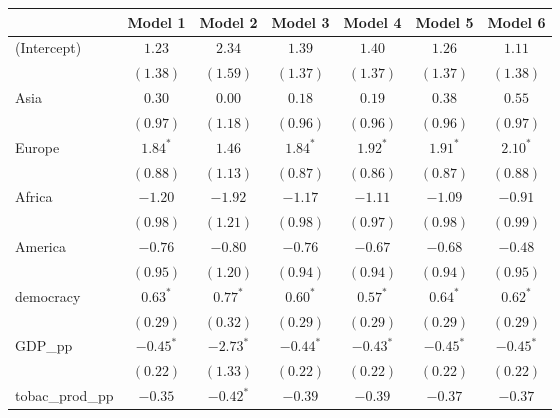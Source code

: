 
\begin{table}[!h]
\begin{center}
\begin{tabular}{l c c c c c c }
\toprule
 & Model 1 & Model 2 & Model 3 & Model 4 & Model 5 & Model 6 \\
\midrule
(Intercept)             & $1.23$       & $2.34$      & $1.39$       & $1.40$       & $1.26$       & $1.11$       \\
                        & $(1.38)$     & $(1.59)$    & $(1.37)$     & $(1.37)$     & $(1.37)$     & $(1.38)$     \\
Asia                    & $0.30$       & $0.00$      & $0.18$       & $0.19$       & $0.38$       & $0.55$       \\
                        & $(0.97)$     & $(1.18)$    & $(0.96)$     & $(0.96)$     & $(0.96)$     & $(0.97)$     \\
Europe                  & $1.84^{*}$   & $1.46$      & $1.84^{*}$   & $1.92^{*}$   & $1.91^{*}$   & $2.10^{*}$   \\
                        & $(0.88)$     & $(1.13)$    & $(0.87)$     & $(0.86)$     & $(0.87)$     & $(0.88)$     \\
Africa                  & $-1.20$      & $-1.92$     & $-1.17$      & $-1.11$      & $-1.09$      & $-0.91$      \\
                        & $(0.98)$     & $(1.21)$    & $(0.98)$     & $(0.97)$     & $(0.98)$     & $(0.99)$     \\
America                 & $-0.76$      & $-0.80$     & $-0.76$      & $-0.67$      & $-0.68$      & $-0.48$      \\
                        & $(0.95)$     & $(1.20)$    & $(0.94)$     & $(0.94)$     & $(0.94)$     & $(0.95)$     \\
democracy               & $0.63^{*}$   & $0.77^{*}$  & $0.60^{*}$   & $0.57^{*}$   & $0.64^{*}$   & $0.62^{*}$   \\
                        & $(0.29)$     & $(0.32)$    & $(0.29)$     & $(0.29)$     & $(0.29)$     & $(0.29)$     \\
GDP\_pp                 & $-0.45^{*}$  & $-2.73^{*}$ & $-0.44^{*}$  & $-0.43^{*}$  & $-0.45^{*}$  & $-0.45^{*}$  \\
                        & $(0.22)$     & $(1.33)$    & $(0.22)$     & $(0.22)$     & $(0.22)$     & $(0.22)$     \\
tobac\_prod\_pp         & $-0.35$      & $-0.42^{*}$ & $-0.39$      & $-0.39$      & $-0.37$      & $-0.37$      \\

\end{tabular}
\end{center}
\end{table}

